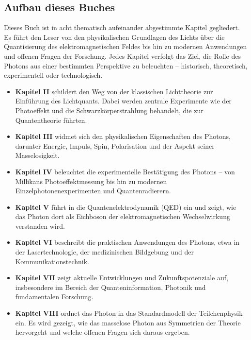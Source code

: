 \subsection{Aufbau dieses Buches}
Dieses Buch ist in acht thematisch aufeinander abgestimmte Kapitel gegliedert. Es führt den Leser von den physikalischen Grundlagen des Lichts über die Quantisierung des elektromagnetischen Feldes bis hin zu modernen Anwendungen und offenen Fragen der Forschung. Jedes Kapitel verfolgt das Ziel, die Rolle des Photons aus einer bestimmten Perspektive zu beleuchten – historisch, theoretisch, experimentell oder technologisch.

\begin{itemize}
	\item \textbf{Kapitel II} schildert den Weg von der klassischen Lichttheorie zur Einführung des Lichtquants. Dabei werden zentrale Experimente wie der Photoeffekt und die Schwarzkörperstrahlung behandelt, die zur Quantentheorie führten.
	
	\item \textbf{Kapitel III} widmet sich den physikalischen Eigenschaften des Photons, darunter Energie, Impuls, Spin, Polarisation und der Aspekt seiner Masselosigkeit.
	
	\item \textbf{Kapitel IV} beleuchtet die experimentelle Bestätigung des Photons – von Millikans Photoeffektmessung bis hin zu modernen Einzelphotonenexperimenten und Quantenradierern.
	
	\item \textbf{Kapitel V} führt in die Quantenelektrodynamik (QED) ein und zeigt, wie das Photon dort als Eichboson der elektromagnetischen Wechselwirkung verstanden wird.
	
	\item \textbf{Kapitel VI} beschreibt die praktischen Anwendungen des Photons, etwa in der Lasertechnologie, der medizinischen Bildgebung und der Kommunikationstechnik.
	
	\item \textbf{Kapitel VII} zeigt aktuelle Entwicklungen und Zukunftspotenziale auf, insbesondere im Bereich der Quanteninformation, Photonik und fundamentalen Forschung.
	
	\item \textbf{Kapitel VIII} ordnet das Photon in das Standardmodell der Teilchenphysik ein. Es wird gezeigt, wie das masselose Photon aus Symmetrien der Theorie hervorgeht und welche offenen Fragen sich daraus ergeben.
\end{itemize}

